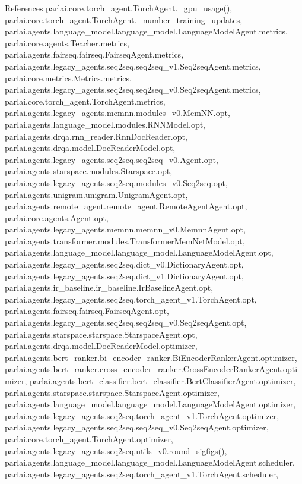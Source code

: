 References parlai.\+core.\+torch\+\_\+agent.\+Torch\+Agent.\+\_\+gpu\+\_\+usage(), parlai.\+core.\+torch\+\_\+agent.\+Torch\+Agent.\+\_\+number\+\_\+training\+\_\+updates, parlai.\+agents.\+language\+\_\+model.\+language\+\_\+model.\+Language\+Model\+Agent.\+metrics, parlai.\+core.\+agents.\+Teacher.\+metrics, parlai.\+agents.\+fairseq.\+fairseq.\+Fairseq\+Agent.\+metrics, parlai.\+agents.\+legacy\+\_\+agents.\+seq2seq.\+seq2seq\+\_\+v1.\+Seq2seq\+Agent.\+metrics, parlai.\+core.\+metrics.\+Metrics.\+metrics, parlai.\+agents.\+legacy\+\_\+agents.\+seq2seq.\+seq2seq\+\_\+v0.\+Seq2seq\+Agent.\+metrics, parlai.\+core.\+torch\+\_\+agent.\+Torch\+Agent.\+metrics, parlai.\+agents.\+legacy\+\_\+agents.\+memnn.\+modules\+\_\+v0.\+Mem\+N\+N.\+opt, parlai.\+agents.\+language\+\_\+model.\+modules.\+R\+N\+N\+Model.\+opt, parlai.\+agents.\+drqa.\+rnn\+\_\+reader.\+Rnn\+Doc\+Reader.\+opt, parlai.\+agents.\+drqa.\+model.\+Doc\+Reader\+Model.\+opt, parlai.\+agents.\+legacy\+\_\+agents.\+seq2seq.\+seq2seq\+\_\+v0.\+Agent.\+opt, parlai.\+agents.\+starspace.\+modules.\+Starspace.\+opt, parlai.\+agents.\+legacy\+\_\+agents.\+seq2seq.\+modules\+\_\+v0.\+Seq2seq.\+opt, parlai.\+agents.\+unigram.\+unigram.\+Unigram\+Agent.\+opt, parlai.\+agents.\+remote\+\_\+agent.\+remote\+\_\+agent.\+Remote\+Agent\+Agent.\+opt, parlai.\+core.\+agents.\+Agent.\+opt, parlai.\+agents.\+legacy\+\_\+agents.\+memnn.\+memnn\+\_\+v0.\+Memnn\+Agent.\+opt, parlai.\+agents.\+transformer.\+modules.\+Transformer\+Mem\+Net\+Model.\+opt, parlai.\+agents.\+language\+\_\+model.\+language\+\_\+model.\+Language\+Model\+Agent.\+opt, parlai.\+agents.\+legacy\+\_\+agents.\+seq2seq.\+dict\+\_\+v0.\+Dictionary\+Agent.\+opt, parlai.\+agents.\+legacy\+\_\+agents.\+seq2seq.\+dict\+\_\+v1.\+Dictionary\+Agent.\+opt, parlai.\+agents.\+ir\+\_\+baseline.\+ir\+\_\+baseline.\+Ir\+Baseline\+Agent.\+opt, parlai.\+agents.\+legacy\+\_\+agents.\+seq2seq.\+torch\+\_\+agent\+\_\+v1.\+Torch\+Agent.\+opt, parlai.\+agents.\+fairseq.\+fairseq.\+Fairseq\+Agent.\+opt, parlai.\+agents.\+legacy\+\_\+agents.\+seq2seq.\+seq2seq\+\_\+v0.\+Seq2seq\+Agent.\+opt, parlai.\+agents.\+starspace.\+starspace.\+Starspace\+Agent.\+opt, parlai.\+agents.\+drqa.\+model.\+Doc\+Reader\+Model.\+optimizer, parlai.\+agents.\+bert\+\_\+ranker.\+bi\+\_\+encoder\+\_\+ranker.\+Bi\+Encoder\+Ranker\+Agent.\+optimizer, parlai.\+agents.\+bert\+\_\+ranker.\+cross\+\_\+encoder\+\_\+ranker.\+Cross\+Encoder\+Ranker\+Agent.\+optimizer, parlai.\+agents.\+bert\+\_\+classifier.\+bert\+\_\+classifier.\+Bert\+Classifier\+Agent.\+optimizer, parlai.\+agents.\+starspace.\+starspace.\+Starspace\+Agent.\+optimizer, parlai.\+agents.\+language\+\_\+model.\+language\+\_\+model.\+Language\+Model\+Agent.\+optimizer, parlai.\+agents.\+legacy\+\_\+agents.\+seq2seq.\+torch\+\_\+agent\+\_\+v1.\+Torch\+Agent.\+optimizer, parlai.\+agents.\+legacy\+\_\+agents.\+seq2seq.\+seq2seq\+\_\+v0.\+Seq2seq\+Agent.\+optimizer, parlai.\+core.\+torch\+\_\+agent.\+Torch\+Agent.\+optimizer, parlai.\+agents.\+legacy\+\_\+agents.\+seq2seq.\+utils\+\_\+v0.\+round\+\_\+sigfigs(), parlai.\+agents.\+language\+\_\+model.\+language\+\_\+model.\+Language\+Model\+Agent.\+scheduler, parlai.\+agents.\+legacy\+\_\+agents.\+seq2seq.\+torch\+\_\+agent\+\_\+v1.\+Torch\+Agent.\+scheduler, 